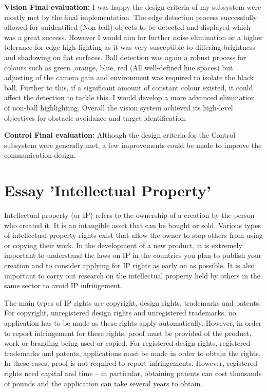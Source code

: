\documentclass[10pt,twoside]{article}
\begin{document}
\textbf{Vision Final evaluation:}  I was happy the design criteria of my subsystem were mostly met by the final implementation. The edge detection process successfully allowed for unidentified (Non ball) objects to be detected and displayed which was a great success. However I would aim for further noise elimination or a higher tolerance for edge high-lighting as it was very susceptible to differing brightness and shadowing on flat surfaces.  Ball detection was again a robust process for colours such as green ,orange, blue, red (All well-defined hue spaces) but adjusting of the camera gain and environment was required to isolate the black ball. Further to this, if a significant amount of constant colour existed, it could affect the detection to tackle this. I would develop a more advanced elimination of non-ball highlighting. Overall the vision system achieved its high-level objectives for obstacle avoidance and target identification. 

\textbf{Control Final evaluation:} Although the design criteria for the Control subsystem were generally met, a few improvements could be made to improve the communication design. %

\newpage
\section{Essay 'Intellectual Property'}

Intellectual property (or IP) refers to the ownership of a creation by the person who created it. \cite{WhatProperty} It is an intangible asset that can be bought or sold. Various types of intellectual property rights exist that allow the owner to stop others from using or copying their work. In the development of a new product, it is extremely important to understand the laws on IP in the countries you plan to publish your creation and to consider applying for IP rights as early on as possible. It is also important to carry out research on the intellectual property held by others in the same sector to avoid  IP infringement.

The main types of IP rights are copyright, design rights, trademarks and patents. \cite{IntellectualGOV.UK} For copyright, unregistered design rights and unregistered trademarks, no application has to be made as these rights apply automatically. However, in order to report infringement for these rights, proof must be provided of the product, work or branding being used or copied. For registered design rights, registered trademarks and patents, applications must be made in order to obtain the rights. In these cases, proof is not required to report infringements. However, registered rights need capital and time – in particular, obtaining patents can cost thousands of pounds and the application can take several years to obtain.  
\end{document}
